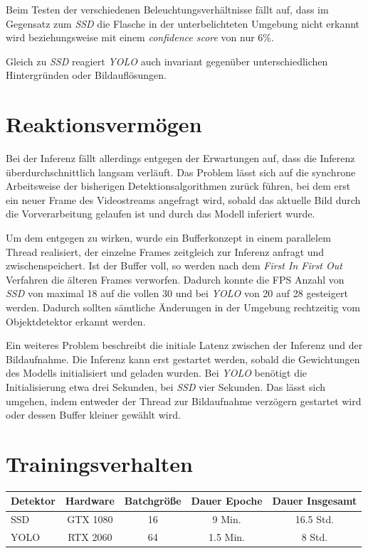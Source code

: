 Beim Testen der verschiedenen Beleuchtungsverhältnisse fällt auf, dass im Gegensatz zum \textit{SSD} die Flasche in der unterbelichteten Umgebung nicht erkannt wird beziehungsweise mit einem \textit{confidence score} von nur 6\%. 

Gleich zu \textit{SSD} reagiert \textit{YOLO} auch invariant gegenüber unterschiedlichen Hintergründen oder Bildauflösungen.
 
\section{Reaktionsvermögen}

Bei der Inferenz fällt allerdings entgegen der Erwartungen auf, dass die Inferenz überdurchschnittlich langsam verläuft. Das Problem lässt sich auf die synchrone Arbeitsweise der bisherigen Detektionsalgorithmen zurück führen, bei dem erst ein neuer Frame des Videostreams angefragt wird, sobald das aktuelle Bild durch die Vorverarbeitung gelaufen ist und durch das Modell inferiert wurde. 

Um dem entgegen zu wirken, wurde ein Bufferkonzept in einem parallelem Thread realisiert, der einzelne Frames zeitgleich zur Inferenz anfragt und zwischenspeichert. Ist der Buffer voll, so werden nach dem \textit{First In First Out} Verfahren die älteren Frames verworfen. Dadurch konnte die FPS Anzahl von \textit{SSD} von maximal 18 auf die vollen 30 und bei \textit{YOLO} von 20 auf 28 gesteigert werden. Dadurch sollten sämtliche Änderungen in der Umgebung rechtzeitig vom Objektdetektor erkannt werden. 

Ein weiteres Problem beschreibt die initiale Latenz zwischen der Inferenz und der Bildaufnahme. Die Inferenz kann erst gestartet werden, sobald die Gewichtungen des Modells initialisiert und geladen wurden. Bei \textit{YOLO} benötigt die Initialisierung etwa drei Sekunden, bei \textit{SSD} vier Sekunden. Das lässt sich umgehen, indem entweder der Thread zur Bildaufnahme verzögern gestartet wird oder dessen Buffer kleiner gewählt wird.

\section{Trainingsverhalten}

\begin{center}
	\begin{tabular}[H]{l|c|c|c|c}
		Detektor & Hardware & Batchgröße & Dauer Epoche & Dauer Insgesamt \\
		\hline
		SSD & GTX 1080 & 16 & 9 Min. & 16.5 Std. \\
		YOLO & RTX 2060 & 64 & 1.5 Min. & 8 Std.
	\end{tabular}
	\label{table:duration}
\end{center}

